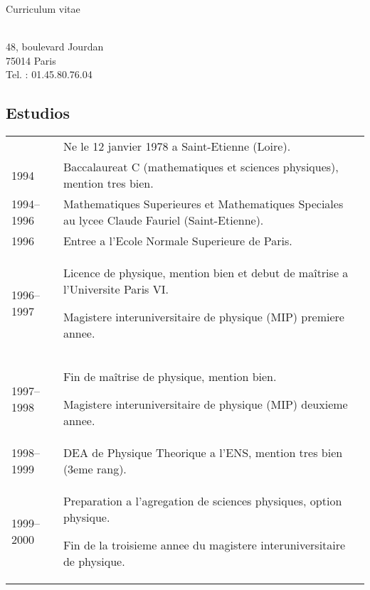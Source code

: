 \documentclass[12pt,a4paper]{article}
\begin{document}
\pagestyle{empty}


\newlength{\annee}
\settowidth{\annee}{Janvier--fevrier}


\newlength{\texte}
\setlength{\texte}{\textwidth} \addtolength{\texte}{-\annee} 
	\addtolength{\texte}{-2\tabcolsep}

\begin{center} \large \sc Curriculum vitae \end{center}

 \\
48, boulevard Jourdan \\
75014 Paris \\
Tel. : 01.45.80.76.04


\subsection*{Estudios}
\noindent \begin{tabular}{@{}p{\annee}p{\texte}@{}}
 & Ne le 12 janvier 1978 a Saint-Etienne (Loire). \\
1994 & Baccalaureat C (mathematiques et sciences physiques), mention 
tres bien. \\
1994--1996 & Mathematiques Superieures et Mathematiques Speciales au lycee
Claude Fauriel (Saint-Etienne). \\
1996 & Entree a l'Ecole Normale Superieure de Paris. \\
1996--1997 & Licence de physique, mention bien et debut de maîtrise a
l'Universite Paris VI. \par
	Magistere interuniversitaire de physique (MIP) premiere annee. \\
1997--1998 & Fin de maîtrise de physique, mention bien. \par
	Magistere interuniversitaire de physique (MIP) deuxieme annee. \\
1998--1999 & DEA de Physique Theorique a l'ENS, mention tres bien 
(3eme rang). \\
1999--2000 & Preparation a l'agregation de sciences physiques, option physique.
\par
	Fin de la troisieme annee du magistere interuniversitaire de physique.
\end{tabular}
\end{document}
